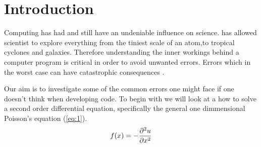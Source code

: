 \section*{Introduction}
Computing has had and still have an undeniable influence on science.
has allowed scientist to explore everything from the tiniest scale of an atom,to tropical cyclones and galaxies.
Therefore understanding the inner workings behind a computer program is critical in order to avoid unwanted errors. Errors which in the worst case can have catastrophic consequences \cite{sleipner_failure}. \par Our aim is to investigate some of the common errors one might face if one doesn't think when developing code. To begin with we will look at a how to solve a second order differential equation, specifically the general one dimmensional Poisson's equation (\ref{eq:1}).
\begin{equation}\label{eq:1}
  f(x)= - \pd[^2u]{x^2}
\end{equation}
